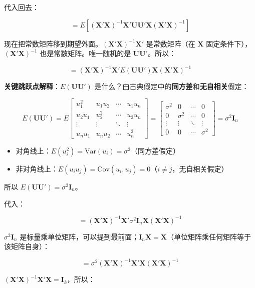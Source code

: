 \documentclass[12pt,a4paper]{ctexart}
\begin{document}
代入回去：

\[
= E[(\mathbf{X}'\mathbf{X})^{-1}\mathbf{X}'\mathbf{U}\mathbf{U}'\mathbf{X}(\mathbf{X}'\mathbf{X})^{-1}]
\]

现在把常数矩阵移到期望外面。$(\mathbf{X}'\mathbf{X})^{-1}\mathbf{X}'$ 是常数矩阵（在 $\mathbf{X}$ 固定条件下），$(\mathbf{X}'\mathbf{X})^{-1}$ 也是常数矩阵。唯一随机的是 $\mathbf{U}\mathbf{U}'$。所以：

\[
= (\mathbf{X}'\mathbf{X})^{-1}\mathbf{X}' E(\mathbf{U}\mathbf{U}') \mathbf{X}(\mathbf{X}'\mathbf{X})^{-1}
\]

\textbf{关键跳跃点解释}：$E(\mathbf{U}\mathbf{U}')$ 是什么？由古典假定中的\textbf{同方差}和\textbf{无自相关}假定：

\[
E(\mathbf{U}\mathbf{U}') = E
\begin{bmatrix}
u_1^2 & u_1 u_2 & \cdots & u_1 u_n \\
u_2 u_1 & u_2^2 & \cdots & u_2 u_n \\
\vdots & \vdots & \ddots & \vdots \\
u_n u_1 & u_n u_2 & \cdots & u_n^2
\end{bmatrix}
=
\begin{bmatrix}
\sigma^2 & 0 & \cdots & 0 \\
0 & \sigma^2 & \cdots & 0 \\
\vdots & \vdots & \ddots & \vdots \\
0 & 0 & \cdots & \sigma^2
\end{bmatrix}
= \sigma^2 \mathbf{I}_n
\]

\begin{itemize}
    \item 对角线上：$E(u_i^2) = \text{Var}(u_i) = \sigma^2$（同方差假定）
    \item 非对角线上：$E(u_i u_j) = \text{Cov}(u_i, u_j) = 0$（$i \neq j$，无自相关假定）
\end{itemize}

所以 $E(\mathbf{U}\mathbf{U}') = \sigma^2 \mathbf{I}_n$。

代入：

\[
= (\mathbf{X}'\mathbf{X})^{-1}\mathbf{X}' \sigma^2 \mathbf{I}_n \mathbf{X}(\mathbf{X}'\mathbf{X})^{-1}
\]

$\sigma^2 \mathbf{I}_n$ 是标量乘单位矩阵，可以提到最前面；$\mathbf{I}_n \mathbf{X} = \mathbf{X}$（单位矩阵乘任何矩阵等于该矩阵自身）：

\[
= \sigma^2 (\mathbf{X}'\mathbf{X})^{-1}\mathbf{X}'\mathbf{X}(\mathbf{X}'\mathbf{X})^{-1}
\]

$(\mathbf{X}'\mathbf{X})^{-1}\mathbf{X}'\mathbf{X} = \mathbf{I}_k$，所以：
\end{document}
